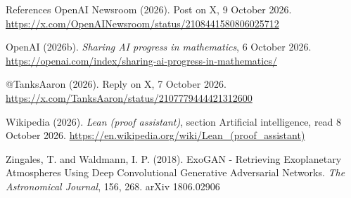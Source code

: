 \documentclass[aspectratio=169,11pt]{beamer}
\begin{document}
\begin{frame}{References}
  OpenAI Newsroom (2026). Post on X, 9 October 2026. \url{https://x.com/OpenAINewsroom/status/2108441580806025712}

  OpenAI (2026b). \emph{Sharing AI progress in mathematics}, 6 October 2026. \url{https://openai.com/index/sharing-ai-progress-in-mathematics/}

  @TanksAaron (2026). Reply on X, 7 October 2026. \url{https://x.com/TanksAaron/status/2107779444421312600}

  Wikipedia (2026). \emph{Lean (proof assistant)}, section Artificial intelligence, read 8 October 2026. \url{https://en.wikipedia.org/wiki/Lean_(proof_assistant)}

  Zingales, T. and Waldmann, I. P. (2018). ExoGAN - Retrieving Exoplanetary Atmospheres Using Deep Convolutional Generative Adversarial Networks. \emph{The Astronomical Journal}, 156, 268. arXiv 1806.02906
\end{frame}
\end{document}
